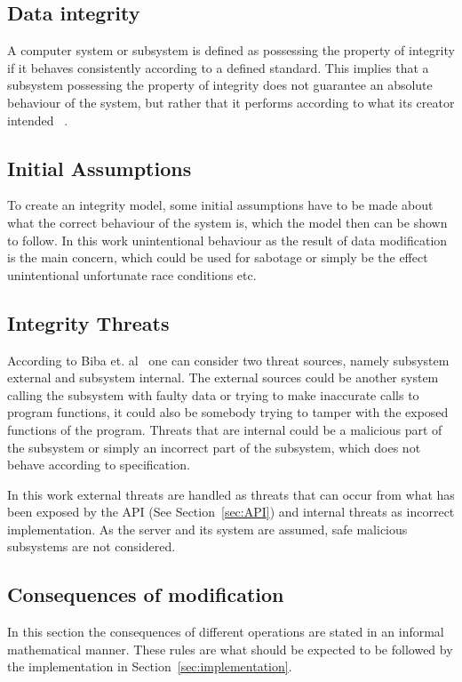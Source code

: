 \documentclass[a4paper,12pt]{article}
\begin{document}
\subsection{Data integrity}
A computer system or subsystem is defined as possessing the property of integrity if it behaves consistently
according to a defined standard. This implies that a subsystem possessing the property of integrity
does not guarantee an absolute behaviour of the system, but rather that it performs according to
what its creator intended ~\cite{BIBA}.

\subsection{Initial Assumptions}
To create an integrity model, some initial assumptions have to be made about what the correct behaviour
of the system is, which the model then can be shown to follow. In this work unintentional behaviour
as the result of data modification is the main concern, which could be used for sabotage or simply be the
effect unintentional unfortunate race conditions etc. 

\subsection{Integrity Threats}
According to Biba et. al~\cite{BIBA} one can consider two threat sources, namely subsystem external
and subsystem internal. The external sources could be another system calling the subsystem with
faulty data or trying to make inaccurate calls to program functions, it could also be somebody
trying to tamper with the exposed functions of the program. Threats that are internal could be a
malicious part of the subsystem or simply an incorrect part of the subsystem, which does not behave
according to specification.

In this work external threats are handled as threats that can occur from what has been exposed by
the API (See Section~\ref{sec:API}) and internal threats as incorrect implementation. As the server
and its system are assumed, safe malicious subsystems are not considered.

\subsection{Consequences of modification} \label{sec:conseq}

In this section the consequences of different operations are stated in an informal mathematical
manner. These rules are what should be expected to be followed by the implementation in
Section~\ref{sec:implementation}. 
\end{document}
